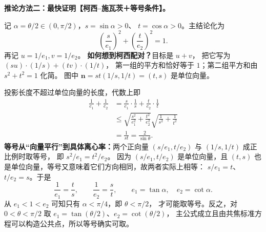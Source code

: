 \clearpage
\begin{proofbox}
\textbf{推论方法二：最快证明【柯西--施瓦茨＋等号条件】。}

记 $\alpha=\theta/2\in(0,\pi/2)$，$s=\sin\alpha>0$、
$t=\cos\alpha>0$。主结论化为
\[
 \left(\frac{s}{e_1}\right)^2+
 \left(\frac{t}{e_2}\right)^2=1.
\]
再记 $u=1/e_1,v=1/e_2$。
\textbf{如何想到柯西配对？}目标是 $u+v$，
把它写为 $(su)\cdot(1/s)+(tv)\cdot(1/t)$，
第一组的平方和恰好等于 $1$；第二组平方和由 $s^2+t^2=1$ 化简。
图中 $\mathbf n=st(1/s,1/t)=(t,s)$ 是单位向量。

\begin{center}

\end{center}
投影长度不超过单位向量的长度，代数上即
\[
 \begin{aligned}
 \frac1{e_1}+\frac1{e_2}
 &=\frac{s}{e_1}\cdot\frac1s+
   \frac{t}{e_2}\cdot\frac1t\\
 &\le\sqrt{\frac{s^2}{e_1^2}+\frac{t^2}{e_2^2}}
 \sqrt{\frac1{s^2}+\frac1{t^2}}\\
 &=\frac1{st}=\frac2{\sin\theta}.
 \end{aligned}
\]
\textbf{等号从“向量平行”到具体离心率：}两个正向量
$(s/e_1,t/e_2)$ 与 $(1/s,1/t)$ 成正比例时取等号，
即 $s^2/e_1=t^2/e_2$。
因为 $(s/e_1,t/e_2)$ 是单位向量，且
$(t,s)$ 也是单位向量，等号又意味着它们方向相同，故两者实际上相等：
$s/e_1=t$、$t/e_2=s$。于是
\[
 \frac1{e_1}=\frac{t}{s},\qquad
 \frac1{e_2}=\frac{s}{t},\qquad
 \boxed{e_1=\tan\alpha,\quad e_2=\cot\alpha}.
\]
从 $e_1<1<e_2$ 可知只有 $\alpha<\pi/4$，即 $\theta<\pi/2$，
才可能取等号。反之，对 $0<\theta<\pi/2$ 取
$e_1=\tan(\theta/2)$、$e_2=\cot(\theta/2)$，
主公式成立且由共焦标准方程可以构造公共点，所以等号确实可取。
\end{proofbox}
